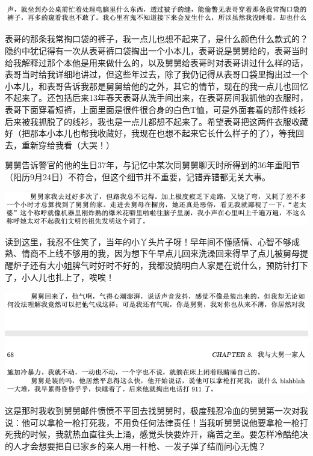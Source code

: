 \documentclass[9pt, b5paper]{article}
\begin{document}
\begin{center}
\includegraphics[width=.9\linewidth]{./pic/p1p67-10.png}
\end{center}

表哥的那条我常掏口袋的裤子，我一点儿也想不起来了，是什么颜色什么款式的？隐约中犹记得有一次从表哥裤口袋掏出一个小本儿，表哥说是舅舅给的，表哥当时给我解释过那个本他是用来做什么的，以及舅舅给表哥时对表哥讲过什么样的话，表哥当时给我详细地讲过，但这些年过去，除了我仍记得从表哥口袋里掏出过一个小本儿，和表哥告诉我那是舅舅给他的之外，其它的情节，现在的我一点儿也回忆不起来了。还包括后来13年春天表哥从洗手间出来，在表哥房间我抓他的衣服时，表哥下面穿着短裤，上面里面是很件很合身的白色T恤，可是外面套着的那件线衫后来被我抓脱了的线衫，我也是一点儿都想不起来了。希望表哥把这两件衣服收藏好（把那本小本儿也帮我收藏好，我现在也想不起来它长什么样子的了），等我回去，重新穿给我看（大哭！）

舅舅告诉警官的他的生日37年，与记忆中某次同舅舅聊天时所得到的36年重阳节（阳历9月24日）不符合，但这个细节并不重要，记错弄错都无关大事。

\begin{center}
\includegraphics[width=.9\linewidth]{./pic/p1p67-9.png}
\end{center}

读到这里，我忍不住笑了，当年的小丫头片子呀！早年间不懂感情、心智不够成熟、情商不上线不够用的我，因为想下午早点儿回来洗澡回来得早了点儿被舅母提醒炉子还有大小姐脾气时好时不好的，我都没搞明白人家是在说什么，预防针打下了，小人儿也扎上了，唉唉！

\begin{center}
\includegraphics[width=.9\linewidth]{./pic/p1p68-3.png}
\end{center}

这是那时我收到舅舅邮件愤愤不平回去找舅舅时，极度残忍冷血的舅舅第一次对我说：他可以拿枪一枪打死我，不用负任何法律责任！当我听舅舅说他要拿枪一枪打死我的时候，我就热血直往头上涌，感觉头快要炸开，痛苦之至。要怎样冷酷绝决的人才会想要把自已家乡的亲人用一杆枪、一发子弹了结而问心无愧？
\end{document}
